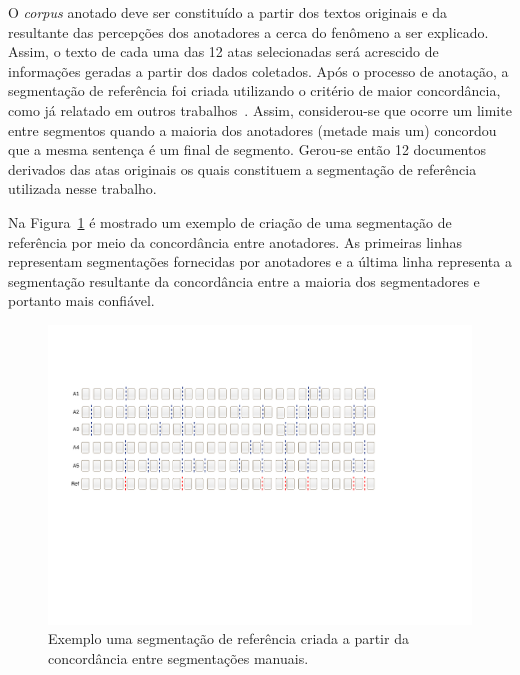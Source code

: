O \textit{corpus} anotado deve ser constituído a partir dos textos originais e da resultante das percepções dos anotadores a cerca do fenômeno a ser explicado. Assim, o texto de cada uma das 12 atas selecionadas será acrescido de informações geradas a partir dos dados coletados. Após o processo de anotação, a segmentação de referência foi criada utilizando o critério de maior concordância, como já relatado em outros trabalhos~\cite{Hearst1997, Cardoso2017, Kazantseva2012, Passonneau1997, Galley2003}. Assim, considerou-se que ocorre um limite entre segmentos quando a maioria dos anotadores (metade mais um) concordou que a mesma sentença é um final de segmento. Gerou-se então 12 documentos derivados das atas originais os quais constituem a segmentação de referência utilizada nesse trabalho.

Na Figura~\ref{fig:concordanciasegref} é mostrado um exemplo de criação de uma segmentação de referência por meio da concordância entre anotadores. As primeiras linhas representam segmentações fornecidas por anotadores e a última linha representa a segmentação resultante da concordância entre a maioria dos segmentadores e portanto mais confiável. 

  \begin{center}
	\begin{figure}[h!]

	\includegraphics[trim={ 45 255 190 120 },clip,page=1,width=\textwidth]{conteudo/capitulos/figs/segmentacao-referencia-2.pdf}

	\caption{Exemplo uma segmentação de referência criada a partir da concordância entre segmentações manuais.}
	\label{fig:concordanciasegref}
	\end{figure}
\end{center}







